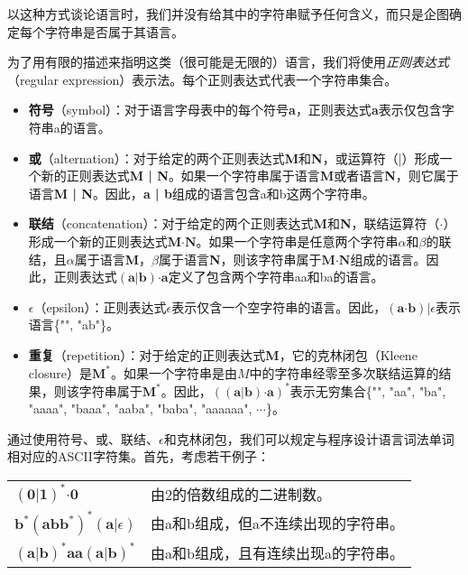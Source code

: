 \documentclass[cn,11pt,chinese]{elegantbook}
\begin{document}
以这种方式谈论语言时，我们并没有给其中的字符串赋予任何含义，而只是企图确定每个字符串是否属于其语言。

为了用有限的描述来指明这类（很可能是无限的）语言，我们将使用\textit{正则表达式}（regular expression）表示法。每个正则表达式代表一个字符串集合。

\begin{itemize}
  \item \textbf{符号}（symbol）：对于语言字母表中的每个符号\textbf{a}，正则表达式\textbf{a}表示仅包含字符串a的语言。
  \item \textbf{或}（alternation）：对于给定的两个正则表达式\textbf{M}和\textbf{N}，或运算符（|）形成一个新的正则表达式\textbf{M | N}。如果一个字符串属于语言\textbf{M}或者语言\textbf{N}，则它属于语言\textbf{M | N}。因此，\textbf{a | b}组成的语言包含a和b这两个字符串。
  \item \textbf{联结}（concatenation）：对于给定的两个正则表达式\textbf{M}和\textbf{N}，联结运算符（$\boldsymbol{\cdot}$）形成一个新的正则表达式$\textbf{M}\boldsymbol{\cdot}\textbf{N}$。如果一个字符串是任意两个字符串$\alpha$和$\beta$的联结，且$\alpha$属于语言\textbf{M}，$\beta$属于语言\textbf{N}，则该字符串属于$\textbf{M}\boldsymbol{\cdot}\textbf{N}$组成的语言。因此，正则表达式$(\textbf{a} | \textbf{b})\boldsymbol{\cdot} \textbf{a}$定义了包含两个字符串aa和ba的语言。
  \item $\epsilon$（epsilon）：正则表达式$\epsilon$表示仅含一个空字符串的语言。因此，$(\textbf{a}\boldsymbol{\cdot}\textbf{b})|\epsilon$表示语言\{"", "ab"\}。
  \item \textbf{重复}（repetition）：对于给定的正则表达式\textbf{M}，它的克林闭包（Kleene closure）是$\textbf{M}^*$。如果一个字符串是由$M$中的字符串经零至多次联结运算的结果，则该字符串属于$\textbf{M}^*$。因此，$((\textbf{a}|\textbf{b})\boldsymbol{\cdot}\textbf{a})^*$表示无穷集合\{"", "aa", "ba", "aaaa", "baaa", "aaba", "baba", "aaaaaa", $\cdots$\}。
\end{itemize}

通过使用符号、或、联结、$\epsilon$和克林闭包，我们可以规定与程序设计语言词法单词相对应的ASCII字符集。首先，考虑若干例子：

\begin{table}[htbp]
  \centering
  \begin{tabular}{ll}
    $(\textbf{0}|\textbf{1})^*\boldsymbol{\cdot}\textbf{0}$ & 由2的倍数组成的二进制数。\\
    $\textbf{b}^*(\textbf{abb}^*)^*(\textbf{a}|\epsilon)$ & 由a和b组成，但a不连续出现的字符串。\\
    $(\textbf{a}|\textbf{b})^*\textbf{aa}(\textbf{a}|\textbf{b})^*$ & 由a和b组成，且有连续出现a的字符串。\\
  \end{tabular}
\end{table}
\end{document}
